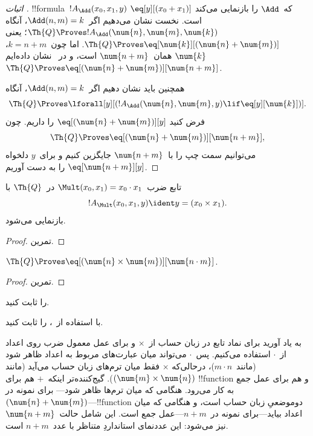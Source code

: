 \documentclass[../../../include/open-logic-section]{subfiles}
\begin{document}
\begin{proof}[اثبات ]
!!{formula}~$!A_\Add(x_0,x_1,y)$ که~$\Add$ را بازنمایی می‌کند
$\eq[y][(x_0+x_1)]$ است. نخست نشان می‌دهیم اگر~$\Add(n,m)=k$، آنگاه
$\Th{Q}\Proves !A_\Add(\num{n},\num{m},\num{k})$؛ یعنی
$\Th{Q}\Proves\eq[\num{k}][(\num{n}+\num{m})]$. اما چون~$k=n+m$،
$\num{k}$ همان~$\num{n+m}$ است، و در~ نشان
داده‌ایم $\Th{Q}\Proves\eq[(\num{n}+\num{m})][\num{n+m}]$.

همچنین باید نشان دهیم اگر~$\Add(n,m)=k$، آنگاه
\[
\Th{Q} \Proves \lforall[y][(!A_\Add(\num{n}, \num{m}, y) \lif
  \eq[y][\num{k}])].
\]
فرض کنید $\eq[(\num{n}+\num{m})][y]$ را داریم. چون
\[
\Th{Q} \Proves \eq[(\num{n}+\num{m})][\num{n+m}],
\]
می‌توانیم سمت چپ را با~$\num{n+m}$ جایگزین کنیم و برای~$y$ دلخواه
$\eq[\num{n+m}][y]$ را به دست آوریم.
\end{proof}

\begin{prop}
تابع ضرب~$\Mult(x_0,x_1)=x_0\cdot x_1$ در~$\Th{Q}$ با
\[
  !A_{\Mult}(x_0, x_1, y) \ident y = (x_0 \times x_1).
\]
بازنمایی می‌شود.
\end{prop}

\begin{proof} تمرین. \end{proof}

\begin{lem}
$\Th{Q} \Proves \eq[(\num{n} \times \num{m})][\num{n \cdot m}]$.
\end{lem}

\begin{proof} تمرین. \end{proof}

\begin{prob}
 را ثابت کنید.
\end{prob}

\begin{prob}
با استفاده از~،
 را ثابت کنید.
\end{prob}

\begin{explain}
  به یاد آورید برای نماد تابع در زبان حساب از~$\times$ و برای عمل
  معمول ضرب روی اعداد از~$\cdot$ استفاده می‌کنیم. پس~$\cdot$ می‌تواند
  میان عبارت‌های مربوط به اعداد ظاهر شود (مانند~$m\cdot n$)، درحالی‌که
  $\times$ فقط میان ترم‌های زبان حساب می‌آید (مانند
  $(\num{m}\times\num{n})$). گیج‌کننده‌تر اینکه~$+$ هم برای !!{function}
  و هم برای عمل جمع به کار می‌رود. هنگامی که میان ترم‌ها ظاهر شود---
  برای نمونه در~$(\num{n}+\num{m})$---!!{function} دوموضعیِ زبان حساب
  است، و هنگامی که میان اعداد بیاید---برای نمونه در~$n+m$---عمل جمع
  است. این شامل حالت~$\num{n+m}$ نیز می‌شود: این عددنمای استانداردِ
  متناظر با عدد~$n+m$ است.
\end{explain}
\end{document}
